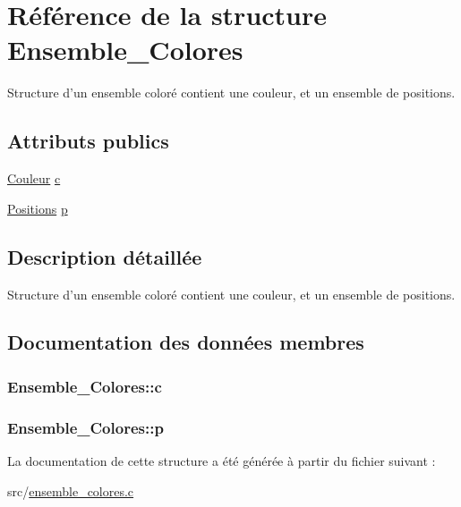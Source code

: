\hypertarget{structEnsemble__Colores}{\section{\-Référence de la structure \-Ensemble\-\_\-\-Colores}
\label{structEnsemble__Colores}
}


\-Structure d'un ensemble coloré contient une couleur, et un ensemble de positions.  


\subsection*{\-Attributs publics}
\begin{DoxyCompactItemize}
\item 
\hyperlink{couleur_8h_aa304d0ca681f782b1d7735da33037dd7}{\-Couleur} \hyperlink{structEnsemble__Colores_ac6e238df5b4b896d72d3a54bceb3502b}{c}
\item 
\hyperlink{positions_8h_abfec3f4df359d071393d062f4aa9bf82}{\-Positions} \hyperlink{structEnsemble__Colores_a8196a1e36f0e484351842f53d892045a}{p}
\end{DoxyCompactItemize}


\subsection{\-Description détaillée}
\-Structure d'un ensemble coloré contient une couleur, et un ensemble de positions. 

\subsection{\-Documentation des données membres}
\hypertarget{structEnsemble__Colores_ac6e238df5b4b896d72d3a54bceb3502b}{
\subsubsection[{c}]{ {\bf \-Ensemble\-\_\-\-Colores\-::c}}}\label{structEnsemble__Colores_ac6e238df5b4b896d72d3a54bceb3502b}
\hypertarget{structEnsemble__Colores_a8196a1e36f0e484351842f53d892045a}{
\subsubsection[{p}]{ {\bf \-Ensemble\-\_\-\-Colores\-::p}}}\label{structEnsemble__Colores_a8196a1e36f0e484351842f53d892045a}


\-La documentation de cette structure a été générée à partir du fichier suivant \-:\begin{DoxyCompactItemize}
\item 
src/\hyperlink{ensemble__colores_8c}{ensemble\-\_\-colores.\-c}\end{DoxyCompactItemize}
